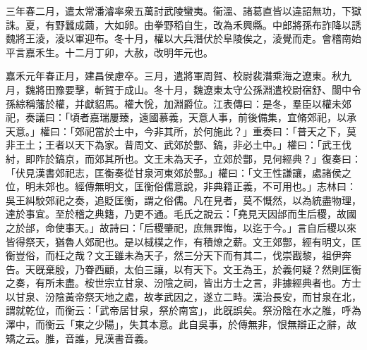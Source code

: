 \begin{pinyinscope}
三年春二月，遣太常潘濬率衆五萬討武陵蠻夷。衞溫、諸葛直皆以違詔無功，下獄誅。夏，有野蠶成繭，大如卵。由拳野稻自生，改為禾興縣。中郎將孫布詐降以誘魏將王淩，淩以軍迎布。冬十月，權以大兵潛伏於阜陵俟之，淩覺而走。會稽南始平言嘉禾生。十二月丁卯，大赦，改明年元也。

嘉禾元年春正月，建昌侯慮卒。三月，遣將軍周賀、校尉裴潛乘海之遼東。秋九月，魏將田豫要擊，斬賀于成山。冬十月，魏遼東太守公孫淵遣校尉宿舒、閬中令孫綜稱藩於權，并獻貂馬。權大恱，加淵爵位。江表傳曰：是冬，羣臣以權未郊祀，奏議曰：「頃者嘉瑞屢臻，遠國慕義，天意人事，前後備集，宜脩郊祀，以承天意。」權曰：「郊祀當於土中，今非其所，於何施此？」重奏曰：「普天之下，莫非王土；王者以天下為家。昔周文、武郊於酆、鎬，非必土中。」權曰：「武王伐紂，即阼於鎬京，而郊其所也。文王未為天子，立郊於酆，見何經典？」復奏曰：「伏見漢書郊祀志，匡衡奏從甘泉河東郊於酆。」權曰：「文王性謙讓，處諸侯之位，明未郊也。經傳無明文，匡衡俗儒意說，非典籍正義，不可用也。」志林曰：吳王糾駮郊祀之奏，追貶匡衡，謂之俗儒。凡在見者，莫不慨然，以為統盡物理，達於事宜。至於稽之典籍，乃更不通。毛氏之說云：「堯見天因邰而生后稷，故國之於邰，命使事天。」故詩曰：「后稷肇祀，庶無罪悔，以迄于今。」言自后稷以來皆得祭天，猶魯人郊祀也。是以棫樸之作，有積燎之薪。文王郊酆，經有明文，匡衡豈俗，而枉之哉？文王雖未為天子，然三分天下而有其二，伐崇戡黎，祖伊奔告。天旣棄殷，乃眷西顧，太伯三讓，以有天下。文王為王，於義何疑？然則匡衡之奏，有所未盡。桉世宗立甘泉、汾陰之祠，皆出方士之言，非據經典者也。方士以甘泉、汾陰黃帝祭天地之處，故孝武因之，遂立二畤。漢治長安，而甘泉在北，謂就乾位，而衡云：「武帝居甘泉，祭於南宮」，此旣誤矣。祭汾陰在水之脽，呼為澤中，而衡云「東之少陽」，失其本意。此自吳事，於傳無非，恨無辯正之辭，故矯之云。脽，音誰，見漢書音義。


\end{pinyinscope}
